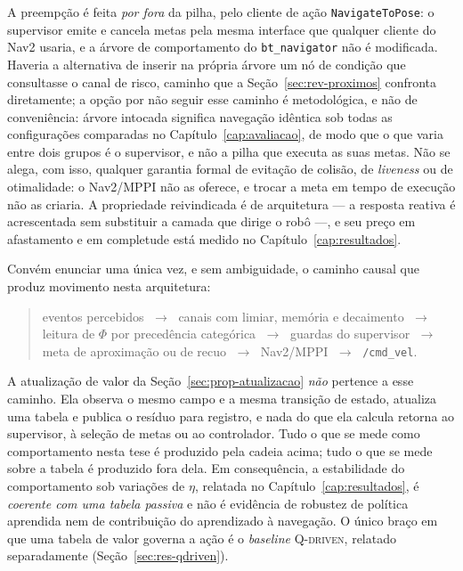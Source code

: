 A preempção é feita \emph{por fora} da pilha, pelo cliente de ação
\texttt{NavigateToPose}: o supervisor emite e cancela metas pela mesma interface que
qualquer cliente do Nav2 usaria, e a árvore de comportamento do \texttt{bt\_navigator}
não é modificada. Haveria a alternativa de inserir na própria árvore um nó de condição
que consultasse o canal de risco, caminho que a Seção~\ref{sec:rev-proximos} confronta
diretamente; a opção por não seguir esse caminho é metodológica, e não de conveniência:
árvore intocada significa navegação idêntica sob todas as configurações comparadas no
Capítulo~\ref{cap:avaliacao}, de modo que o que varia entre dois grupos é o supervisor,
e não a pilha que executa as suas metas. Não
se alega, com isso, qualquer garantia formal de evitação de colisão, de
\textit{liveness} ou de otimalidade: o Nav2/MPPI não as oferece, e trocar a meta em
tempo de execução não as criaria. A propriedade reivindicada é de arquitetura ---
a resposta reativa é acrescentada sem substituir a camada que dirige o robô ---,
e seu preço em afastamento e em completude está medido no
Capítulo~\ref{cap:resultados}.

Convém enunciar uma única vez, e sem ambiguidade, o caminho causal que produz
movimento nesta arquitetura:

\begin{quote}
eventos percebidos $\;\rightarrow\;$ canais com limiar, memória e decaimento
$\;\rightarrow\;$ leitura de $\Phi$ por precedência categórica $\;\rightarrow\;$
guardas do supervisor $\;\rightarrow\;$ meta de aproximação ou de recuo
$\;\rightarrow\;$ Nav2/MPPI $\;\rightarrow\;$ \texttt{/cmd\_vel}.
\end{quote}

A atualização de valor da Seção~\ref{sec:prop-atualizacao} \emph{não} pertence a esse
caminho. Ela observa o mesmo campo e a mesma transição de estado, atualiza uma tabela e
publica o resíduo para registro, e nada do que ela calcula retorna ao supervisor, à
seleção de metas ou ao controlador. Tudo o que se mede como comportamento nesta tese é
produzido pela cadeia acima; tudo o que se mede sobre a tabela é produzido fora dela.
Em consequência, a estabilidade do comportamento sob variações de $\eta$, relatada no
Capítulo~\ref{cap:resultados}, é \emph{coerente com uma tabela passiva} e não é
evidência de robustez de política aprendida nem de contribuição do aprendizado à
navegação. O único braço em que uma tabela de valor governa a ação é o
\textit{baseline} \textsc{Q-driven}, relatado separadamente
(Seção~\ref{sec:res-qdriven}).

